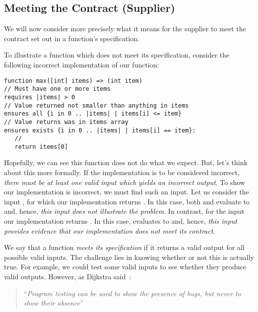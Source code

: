 \subsection{Meeting the Contract (Supplier)}

We will now consider more precisely what it means for the supplier to meet the contract set out in a function's specification.  

\begin{eg}
To illustrate a function which does not meet its specification, consider the following incorrect implementation of our  function:
\begin{tcolorbox}\begin{lstlisting}[language=Whiley]
function max([int] items) => (int item) 
// Must have one or more items
requires |items| > 0
// Value returned not smaller than anything in items
ensures all {i in 0 .. |items| | items[i] <= item}
// Value returns was in items array
ensures exists {i in 0 .. |items| | items[i] == item}:
   //
   return items[0]
\end{lstlisting}\end{tcolorbox}
Hopefully, we can see this function does not do what we expect.  But, let's think about this more formally.  If the implementation is to be considered incorrect, {\em there must be at least one valid input which yields an incorrect output}.  To show our implementation is incorrect, we must find such an input.  Let us consider the input \clstinline{[5]}, for which our implementation returns .  In this case, both  and  evaluate to  and, hence, {\em this input does not illustrate the problem}.  In contrast, for the input \clstinline{[1,4]} our implementation returns .  In this case,  evaluates to  and, hence, {\em this input provides evidence that our implementation does not meet its contract}.
\end{eg}

We say that a function {\em meets its specification} if it returns a valid output for all possible valid inputs.  The challenge lies in knowing whether or not this is actually true.  For example, we could test some valid inputs to see whether they produce valid outputs.  However, as Dijkstra said~\cite{EWD249}:

\begin{quote}
 ``{\em Program testing can be used to show the presence of bugs, but never to show their absence}''
\end{quote}

